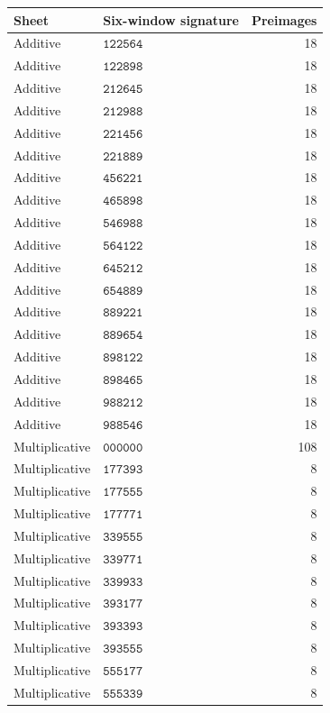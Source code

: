 \begin{table}[!htbp]\centering\fontsize{9}{10.4}\selectfont\renewcommand{\arraystretch}{1.02}\begin{tabular}{@{}llr@{}}
\toprule Sheet&Six-window signature&Preimages\\\midrule
Additive&\(\mathtt{122564}\)&18\\
Additive&\(\mathtt{122898}\)&18\\
Additive&\(\mathtt{212645}\)&18\\
Additive&\(\mathtt{212988}\)&18\\
Additive&\(\mathtt{221456}\)&18\\
Additive&\(\mathtt{221889}\)&18\\
Additive&\(\mathtt{456221}\)&18\\
Additive&\(\mathtt{465898}\)&18\\
Additive&\(\mathtt{546988}\)&18\\
Additive&\(\mathtt{564122}\)&18\\
Additive&\(\mathtt{645212}\)&18\\
Additive&\(\mathtt{654889}\)&18\\
Additive&\(\mathtt{889221}\)&18\\
Additive&\(\mathtt{889654}\)&18\\
Additive&\(\mathtt{898122}\)&18\\
Additive&\(\mathtt{898465}\)&18\\
Additive&\(\mathtt{988212}\)&18\\
Additive&\(\mathtt{988546}\)&18\\
Multiplicative&\(\mathtt{000000}\)&108\\
Multiplicative&\(\mathtt{177393}\)&8\\
Multiplicative&\(\mathtt{177555}\)&8\\
Multiplicative&\(\mathtt{177771}\)&8\\
Multiplicative&\(\mathtt{339555}\)&8\\
Multiplicative&\(\mathtt{339771}\)&8\\
Multiplicative&\(\mathtt{339933}\)&8\\
Multiplicative&\(\mathtt{393177}\)&8\\
Multiplicative&\(\mathtt{393393}\)&8\\
Multiplicative&\(\mathtt{393555}\)&8\\
Multiplicative&\(\mathtt{555177}\)&8\\
Multiplicative&\(\mathtt{555339}\)&8\\

\end{tabular}
\end{table}
